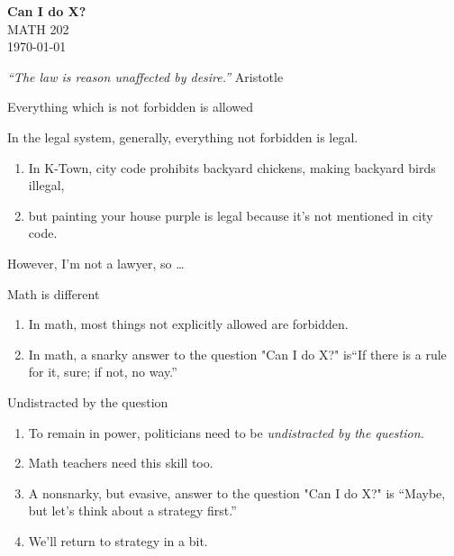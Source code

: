 \documentclass[portrait,fleqn,12pt]{beamer}
\newenvironment{handlist}
   {\begin{enumerate}[\faHandPointRight]
       \addtolength{\itemsep}{0.0\itemsep}}
     {\end{enumerate}}
\begin{document}
\begin{frame}
\begin{flushleft} 
\textbf{Can I do X?} \\
MATH 202 \\
\today 
\end{flushleft}


\emph{“The law is reason unaffected by desire.”} \hfill {\sc Aristotle } 
\end{frame}


\begin{frame}[fragile]{Everything which is not forbidden is allowed}

In the legal system, generally, everything not forbidden is legal.  

\begin{handlist}
 \item In K-Town, city code prohibits backyard chickens, making backyard birds illegal, 
 
 \item but painting your house purple is legal because it's not mentioned in city code.
 \end{handlist}
 
 However, I'm not a lawyer, so \dots
\end{frame}
 
\begin{frame}{Math is different}
 
\begin{handlist}
\item[\faHandPointRight] In math, most things not explicitly allowed are forbidden.
\item[\faHandPointRight] In math, a snarky answer to the question "Can I do X?"  is``If there is a rule for it, sure; if not, no way.''
\end{handlist}
 \vfill
\end{frame}

\begin{frame}{Undistracted by the question}

\begin{handlist}
\item To remain in power, politicians need to be \emph{undistracted by the question.}

\item Math teachers need this skill too.

\item A nonsnarky, but evasive,  answer to the question  "Can I do X?" is ``Maybe, but let's think about a strategy first.'' 

\item We'll return to strategy in a bit.
\end{handlist}
\end{frame}
\end{document}
